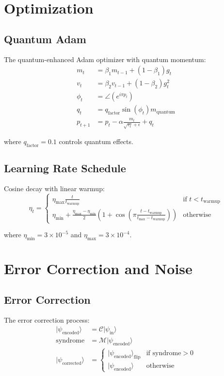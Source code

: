 \documentclass{article}
\begin{document}
\section{Optimization}

\subsection{Quantum Adam}
The quantum-enhanced Adam optimizer with quantum momentum:
\begin{align*}
m_t &= \beta_1 m_{t-1} + (1-\beta_1)g_t \\
v_t &= \beta_2 v_{t-1} + (1-\beta_2)g_t^2 \\
\phi_t &= \angle(e^{i\pi p_t}) \\
q_t &= q_{\text{factor}} \sin(\phi_t) m_{\text{quantum}} \\
p_{t+1} &= p_t - \alpha\frac{m_t}{\sqrt{v_t} + \epsilon} + q_t
\end{align*}

where $q_{\text{factor}}=0.1$ controls quantum effects.

\subsection{Learning Rate Schedule}
Cosine decay with linear warmup:
\begin{equation}
\eta_t = \begin{cases}
\eta_{\text{max}}\frac{t}{t_{\text{warmup}}} & \text{if } t < t_{\text{warmup}} \\
\eta_{\text{min}} + \frac{\eta_{\text{max}}-\eta_{\text{min}}}{2}(1 + \cos(\pi\frac{t-t_{\text{warmup}}}{t_{\text{max}}-t_{\text{warmup}}})) & \text{otherwise}
\end{cases}
\end{equation}

where $\eta_{\text{min}}=3\times10^{-5}$ and $\eta_{\text{max}}=3\times10^{-4}$.

\section{Error Correction and Noise}

\subsection{Error Correction}
The error correction process:
\begin{align*}
|\psi_{\text{encoded}}\rangle &= \mathcal{C}|\psi_{\text{in}}\rangle \\
\text{syndrome} &= \mathcal{M}|\psi_{\text{encoded}}\rangle \\
|\psi_{\text{corrected}}\rangle &= \begin{cases}
|\psi_{\text{encoded}}\rangle_{\text{flip}} & \text{if syndrome} > 0 \\
|\psi_{\text{encoded}}\rangle & \text{otherwise}
\end{cases}
\end{align*}
\end{document}
